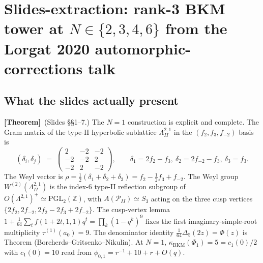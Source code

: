 
\providecommand{\ClaimStatusTheorem}{\textbf{[Theorem]}}
\providecommand{\ClaimStatusConjectured}{\textbf{[Conjectured]}}
\providecommand{\ClaimStatusAxiomatic}{\textbf{[Axiomatic]}}
\providecommand{\kBKM}{\kappa_{\mathrm{BKM}}}

\section*{Slides-extraction: rank-3 BKM tower at $N \in \{2,3,4,6\}$
from the Lorgat 2020 automorphic-corrections talk}
\label{sec:slides-l3-rank3-bkm-tower}

\subsection*{What the slides actually present}

\ClaimStatusTheorem\ (Slides \S\S 1--7.) The $N=1$ construction is
explicit and complete. The Gram matrix of the type-II hyperbolic
sublattice $\Lambda^{2,1}_{II}$ in the $(f_2, f_3, f_{-2})$ basis is
\[
  (\delta_i, \delta_j) \;=\;
  \begin{pmatrix} 2 & -2 & -2 \\ -2 & -2 & 2 \\ -2 & 2 & -2 \end{pmatrix},
  \qquad \delta_1 = 2f_2 - f_3,\ \delta_2 = 2f_{-2} - f_3,\ \delta_3 = f_3.
\]
The Weyl vector is
$\rho = \tfrac{1}{2}(\delta_1 + \delta_2 + \delta_3)
  = f_2 - \tfrac{1}{2} f_3 + f_{-2}$.
The Weyl group $W^{(2)}(\Lambda^{2,1}_{II})$ is the index-$6$ type-II
reflection subgroup of $O(\Lambda^{2,1})^+ \simeq \mathrm{PGL}_2(\mathbb{Z})$,
with $A(\mathcal{P}_{II}) \simeq S_3$ acting on the three cusp vertices
$\{2f_2, 2f_{-2}, 2f_2 - 2f_3 + 2f_{-2}\}$. The cusp-vertex lemma
$1 + \tfrac{1}{64}\sum_t f(1+2t, 1, 1) q^t = \prod_k (1 - q^k)^9$ fixes
the first imaginary-simple-root multiplicity $\tau^{(1)}(a_0) = 9$.
The denominator identity
$\tfrac{1}{64} \Delta_5(2z) = \Phi(z)$ is Theorem
(Borcherds--Gritsenko--Nikulin). At $N=1$, $\kBKM(\Phi_1) = 5 = c_1(0)/2$
with $c_1(0) = 10$ read from $\phi_{0,1} = r^{-1} + 10 + r + O(q)$.

